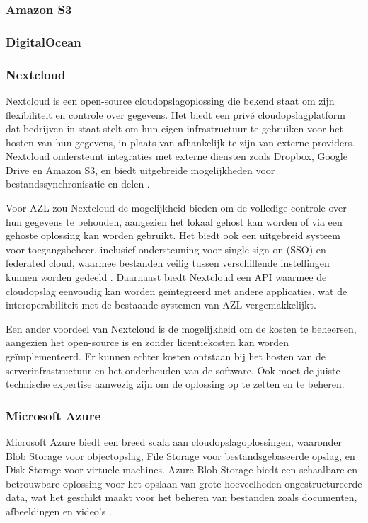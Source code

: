 \subsubsection{Amazon S3}

\subsubsection{DigitalOcean}


\subsubsection{Nextcloud}
Nextcloud is een open-source cloudopslagoplossing die bekend staat om zijn flexibiliteit en controle over gegevens. Het biedt een privé cloudopslagplatform dat bedrijven in staat stelt om hun eigen infrastructuur te gebruiken voor het hosten van hun gegevens, in plaats van afhankelijk te zijn van externe providers. Nextcloud ondersteunt integraties met externe diensten zoals Dropbox, Google Drive en Amazon S3, en biedt uitgebreide mogelijkheden voor bestandssynchronisatie en delen \autocite{nextcloud_features}.

Voor AZL zou Nextcloud de mogelijkheid bieden om de volledige controle over hun gegevens te behouden, aangezien het lokaal gehost kan worden of via een gehoste oplossing kan worden gebruikt. Het biedt ook een uitgebreid systeem voor toegangsbeheer, inclusief ondersteuning voor single sign-on (SSO) en federated cloud, waarmee bestanden veilig tussen verschillende instellingen kunnen worden gedeeld \autocite{nextcloud_sso}. Daarnaast biedt Nextcloud een API waarmee de cloudopslag eenvoudig kan worden geïntegreerd met andere applicaties, wat de interoperabiliteit met de bestaande systemen van AZL vergemakkelijkt.

Een ander voordeel van Nextcloud is de mogelijkheid om de kosten te beheersen, aangezien het open-source is en zonder licentiekosten kan worden geïmplementeerd. Er kunnen echter kosten ontstaan bij het hosten van de serverinfrastructuur en het onderhouden van de software. Ook moet de juiste technische expertise aanwezig zijn om de oplossing op te zetten en te beheren.

\subsubsection{Microsoft Azure}
Microsoft Azure biedt een breed scala aan cloudopslagoplossingen, waaronder Blob Storage voor objectopslag, File Storage voor bestandsgebaseerde opslag, en Disk Storage voor virtuele machines. Azure Blob Storage biedt een schaalbare en betrouwbare oplossing voor het opslaan van grote hoeveelheden ongestructureerde data, wat het geschikt maakt voor het beheren van bestanden zoals documenten, afbeeldingen en video's \autocite{azure_blob}.

